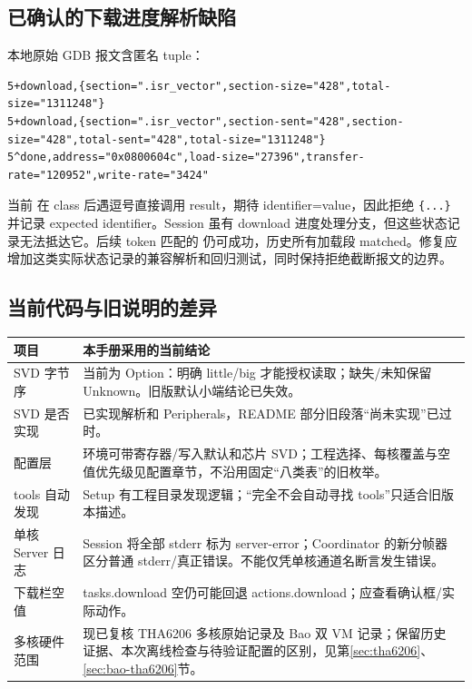 \documentclass[UTF8,a4paper,11pt,oneside,fontset=none]{ctexart}
\newcommand{\code}[1]{\texttt{\detokenize{#1}}}
\begin{document}
\subsection{已确认的下载进度解析缺陷}
本地原始 GDB 报文含匿名 tuple：
\par\noindent\begin{minipage}{\linewidth}
\begin{lstlisting}
5+download,{section=".isr_vector",section-size="428",total-size="1311248"}
5+download,{section=".isr_vector",section-sent="428",section-size="428",total-sent="428",total-size="1311248"}
5^done,address="0x0800604c",load-size="27396",transfer-rate="120952",write-rate="3424"
\end{lstlisting}
\end{minipage}\par
当前 \code{mi::parse} 在 class 后遇逗号直接调用 result，期待 identifier=value，因此拒绝 \texttt{\{...\}} 并记录 expected identifier。Session 虽有 download 进度处理分支，但这些状态记录无法抵达它。后续 token 匹配的 \code{^done} 仍可成功，历史所有加载段 matched。修复应增加这类实际状态记录的兼容解析和回归测试，同时保持拒绝截断报文的边界。

\subsection{当前代码与旧说明的差异}
\noindent\begin{tabularx}{\linewidth}{@{}P{36mm}Y@{}}\toprule
项目 & 本手册采用的当前结论\\\midrule
SVD 字节序 & 当前为 Option：明确 little/big 才能授权读取；缺失/未知保留 Unknown。旧版默认小端结论已失效。\\
SVD 是否实现 & 已实现解析和 Peripherals，README 部分旧段落“尚未实现”已过时。\\
配置层 & 环境可带寄存器/写入默认和芯片 SVD；工程选择、每核覆盖与空值优先级见配置章节，不沿用固定“八类表”的旧枚举。\\
tools 自动发现 & Setup 有工程目录发现逻辑；“完全不会自动寻找 tools”只适合旧版本描述。\\
单核 Server 日志 & Session 将全部 stderr 标为 server-error；Coordinator 的新分帧器区分普通 stderr/真正错误。不能仅凭单核通道名断言发生错误。\\
下载栏空值 & tasks.download 空仍可能回退 actions.download；应查看确认框/实际动作。\\
多核硬件范围 & 现已复核 THA6206 多核原始记录及 Bao 双 VM 记录；保留历史证据、本次离线检查与待验证配置的区别，见第\ref{sec:tha6206}、\ref{sec:bao-tha6206}节。\\\bottomrule
\end{tabularx}
\end{document}
